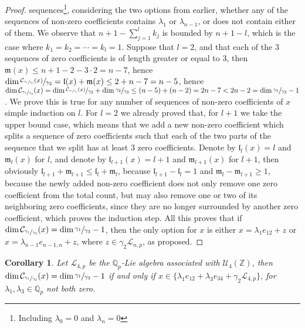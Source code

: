 \documentclass[12pt]{article}
\newtheorem{corollary}[theorem]{Corollary}
\begin{document}
\begin{proof}
sequences\footnote{Including $\lambda_0=0$ and $\lambda_n=0$}, considering the two options from earlier, whether any of the sequences of non-zero coefficients contains $\lambda_1$ or $\lambda_{n-1}$, or does not contain either of them. We observe that $n+1-\sum_{j=1}^l k_j$ is bounded by $n+1-l$, which is the case where $k_1=k_2=\cdots=k_l=1$. Suppose that $l=2$, and that each of the $3$ sequences of zero coefficients is of length greater or equal to $3$, then $\mathfrak{m}(x)\leq n+1-2-3\cdot 2=n-7$, hence $\dim\sfrac{\mathcal{C}_{\sfrac{\gamma_1}{\gamma_3}}(x)}{\gamma_2}=\mathfrak{l}(x)+\mathfrak{m}(x)\leq 2+n-7=n-5$, hence $\dim\mathcal{C}_{\sfrac{\gamma_1}{\gamma_3}}(x)=\dim\sfrac{\mathcal{C}_{\sfrac{\gamma_1}{\gamma_3}}(x)}{\gamma_2}+\dim\sfrac{\gamma_2}{\gamma_3}\leq (n-5)+(n-2)=2n-7<2n-2=\dim\sfrac{\gamma_1}{\gamma_3}-1$. We prove this is true for any number of sequences of non-zero coefficients of $x$ simple induction on $l$. For $l=2$ we already proved that, for $l+1$ we take the upper bound case, which means that we add a new non-zero coefficient which splits a sequence of zero coefficients such that each of the two parts of the sequence that we split has at least $3$ zero coefficients. Denote by $\mathfrak{l}_l(x)=l$ and $\mathfrak{m}_l(x)$ for $l$, and denote by $\mathfrak{l}_{l+1}(x)=l+1$ and $\mathfrak{m}_{l+1}(x)$ for $l+1$, then obviously $\mathfrak{l}_{l+1}+\mathfrak{m}_{l+1}\leq\mathfrak{l}_l+\mathfrak{m}_l$, because $\mathfrak{l}_{l+1}-\mathfrak{l}_l=1$ and $\mathfrak{m}_{l}-\mathfrak{m}_{l+1}\geq 1$, because the newly added non-zero coefficient does not only remove one zero coefficient from the total count, but may also remove one or two of its neighboring zero coefficients, since they are no longer surrounded by another zero coefficient, which proves the induction step. All this proves that if $\dim\mathcal{C}_{\sfrac{\gamma_1}{\gamma_3}}(x)=\dim\sfrac{\gamma_1}{\gamma_3}-1$, then the only option for $x$ is either $x=\lambda_1 e_{12}+z$ or $x=\lambda_{n-1}e_{n-1,n}+z$, where $z\in\gamma_2\mathcal{L}_{n,p}$, as proposed.
\end{proof}
\begin{corollary}
\label{prop.n.geq.4.centralizer.codimension}
Let $\mathcal{L}_{4,p}$ be the $\mathbb{Q}_p$-Lie algebra associated with $\mathcal{U}_4(\mathbb{Z})$, then $\dim\mathcal{C}_{\sfrac{\gamma_1}{\gamma_3}}(x)=\dim\sfrac{\gamma_1}{\gamma_3}-1$ if and only if $x\in\{\lambda_1 e_{12}+\lambda_3 e_{34}+\gamma_2\mathcal{L}_{4,p}\}$, for $\lambda_1,\lambda_3\in\mathbb{Q}_p$ not both zero.
\end{corollary}
\end{document}
